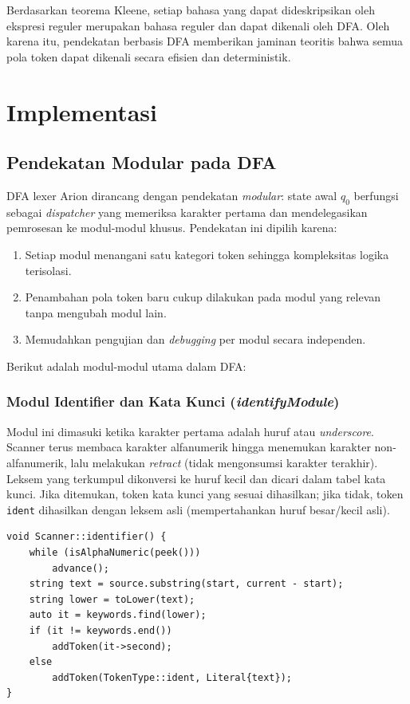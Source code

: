 \documentclass[12pt,a4paper]{article}
\begin{document}
Berdasarkan teorema Kleene, setiap bahasa yang dapat dideskripsikan oleh ekspresi reguler merupakan bahasa reguler dan dapat dikenali oleh DFA. Oleh karena itu, pendekatan berbasis DFA memberikan jaminan teoritis bahwa semua pola token dapat dikenali secara efisien dan deterministik.

\section{Implementasi}

\subsection{Pendekatan Modular pada DFA}
DFA lexer Arion dirancang dengan pendekatan \textit{modular}: state awal $q_0$ berfungsi sebagai \textit{dispatcher} yang memeriksa karakter pertama dan mendelegasikan pemrosesan ke modul-modul khusus. Pendekatan ini dipilih karena:
\begin{enumerate}[label=\arabic*.]
  \item Setiap modul menangani satu kategori token sehingga kompleksitas logika terisolasi.
  \item Penambahan pola token baru cukup dilakukan pada modul yang relevan tanpa mengubah modul lain.
  \item Memudahkan pengujian dan \textit{debugging} per modul secara independen.
\end{enumerate}

Berikut adalah modul-modul utama dalam DFA:

\subsubsection{Modul Identifier dan Kata Kunci (\textit{identifyModule})}
Modul ini dimasuki ketika karakter pertama adalah huruf atau \textit{underscore}. Scanner terus membaca karakter alfanumerik hingga menemukan karakter non-alfanumerik, lalu melakukan \textit{retract} (tidak mengonsumsi karakter terakhir). Leksem yang terkumpul dikonversi ke huruf kecil dan dicari dalam tabel kata kunci. Jika ditemukan, token kata kunci yang sesuai dihasilkan; jika tidak, token \texttt{ident} dihasilkan dengan leksem asli (mempertahankan huruf besar/kecil asli).

\begin{lstlisting}[style=cpp, caption={Penanganan identifier dan kata kunci}]
void Scanner::identifier() {
    while (isAlphaNumeric(peek()))
        advance();
    string text = source.substring(start, current - start);
    string lower = toLower(text);
    auto it = keywords.find(lower);
    if (it != keywords.end())
        addToken(it->second);
    else
        addToken(TokenType::ident, Literal{text});
}
\end{lstlisting}
\end{document}

